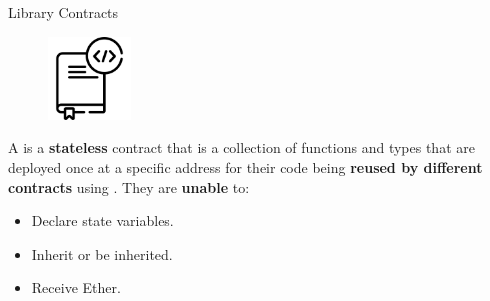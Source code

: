 \documentclass[]{beamer}
\begin{document}
\begin{frame}{Library Contracts}

\begin{minipage}{0.25\textwidth}
	\begin{figure}
		\center
		\includegraphics[width= 2.2cm]{../assets/images/library.png}	
	\end{figure}
\end{minipage}
\begin{minipage}{0.7\textwidth}
	\vspace{1em}
	A  is a \textbf{stateless} contract that is a collection of functions and types that are deployed once at a specific address for their code being \textbf{reused by different contracts} using . They are \textbf{unable} to:

	\begin{itemize}
		\item	Declare state variables.
		\item	Inherit or be inherited.
		\item	Receive Ether.
	\end{itemize}
\end{minipage}

\vspace{1em}


\end{frame}
\end{document}
